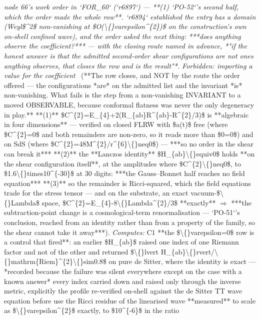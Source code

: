 \begin{description}
\textit{node 66's work order in `FOR\_60` (`r6897`) --- **(1) `PO-52`'s second half, which the order made the whole row**. `r6894` established the entry has a domain (Weyl\$\textasciicircum{}2\$ non-vanishing at \$O(\textbackslash\{\}varepsilon\textasciicircum{}\{2\})\$ on the construction's own on-shell confined wave), and the order asked the next thing: ***does anything observe the coefficient?*** --- with the closing route named in advance, *"if the honest answer is that the admitted second-order shear configurations are not ones anything observes, that closes the row and is the result"*. Forbidden: importing a value for the coefficient} \ (**The row closes, and NOT by the route the order offered --- the configurations *are* on the admitted list and the invariant *is* non-vanishing. What fails is the step from a non-vanishing INVARIANT to a moved OBSERVABLE, because conformal flatness was never the only degeneracy in play.**  **(1)** \$C\textasciicircum{}\{2\}=E\_\{4\}+2(R\_\{ab\}R\textasciicircum{}\{ab\}-R\textasciicircum{}\{2\}/3)\$ is **algebraic in four dimensions** --- verified on closed FLRW with \$a(t)\$ free (where \$C\textasciicircum{}\{2\}=0\$ and both remainders are non-zero, so it reads more than \$0=0\$) and on SdS (where \$C\textasciicircum{}\{2\}=48M\textasciicircum{}\{2\}/r\textasciicircum{}\{6\}\textbackslash\{\}neq0\$) --- ***so no order in the shear can break it***  **(2)** the **Lanczos identity** \$H\_\{ab\}\textbackslash\{\}equiv0\$ holds **on the shear configuration itself**, at the amplitudes where \$C\textasciicircum{}\{2\}\textbackslash\{\}neq0\$, to \$1.6\textbackslash\{\}times10\textasciicircum{}\{-30\}\$ at 30 digits: ***the Gauss--Bonnet half reaches no field equation***  **(3)** so the remainder is Ricci-squared, which the field equations trade for the stress tensor --- and on the substrate, an exact vacuum-\$\textbackslash\{\}Lambda\$ space, \$C\textasciicircum{}\{2\}=E\_\{4\}-8\textbackslash\{\}Lambda\textasciicircum{}\{2\}/3\$ **exactly** \ensuremath{\Rightarrow}  ***the subtraction-point change is a cosmological-term renormalisation --- `PO-51`'s conclusion, reached from an identity rather than from a property of the family, so the shear cannot take it away***). 
\emph{Computes:} C1 **the \$\textbackslash\{\}varepsilon=0\$ row is a control that fired**: an earlier \$H\_\{ab\}\$ raised one index of one Riemann factor and not of the other and returned \$\textbackslash\{\}lvert H\_\{ab\}\textbackslash\{\}rvert/\textbackslash\{\}mathrm\{Riem\}\textasciicircum{}\{2\}\textbackslash\{\}sim0.8\$ on pure de Sitter, where the identity is exact --- *recorded because the failure was silent everywhere except on the case with a known answer*  every index carried down and raised only through the inverse metric, explicitly  the profile re-verified on-shell against the de Sitter TT wave equation before use  the Ricci residue of the linearised wave **measured** to scale as \$\textbackslash\{\}varepsilon\textasciicircum{}\{2\}\$ exactly, to \$10\textasciicircum{}\{-6\}\$ in the ratio

\end{description}
